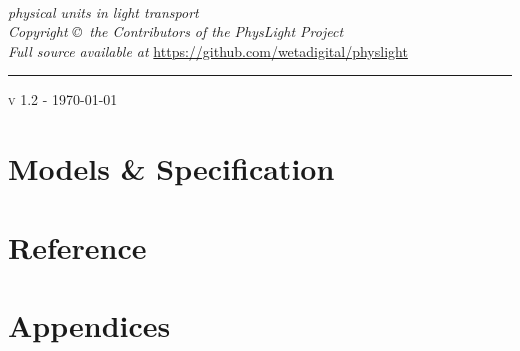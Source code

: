 \documentclass{physlight}
\def\physLightVersion{v 1.2 - \today}
\begin{document}
\nocite{*}

\begin{titlepage}
\begin{center}

{\fontsize{60}{72}\selectfont \physLight}\\[.3cm]

\textsf{\textit{\fontsize{24}{26.8}\selectfont physical units in light transport}}\\[1.5cm]

\vfill
\large
\textit{Copyright \copyright\ the Contributors of the PhysLight Project}\\[1mm]
\textit{Full source available at} \url{https://github.com/wetadigital/physlight}\\[1mm]

\hrule \vspace{1mm}
\textsc{\large \physLightVersion}\\[0.5cm]

\end{center}
\end{titlepage}

\tableofcontents
\listoffigures
\listoftables


\part{Models \& Specification}\label{part:models}






\part{Reference}\label{part:ref}




\part{Appendices}\label{part:app}
\appendix






\printglossaries

\clearpage
{}
{}
\printbibliography
\end{document}

